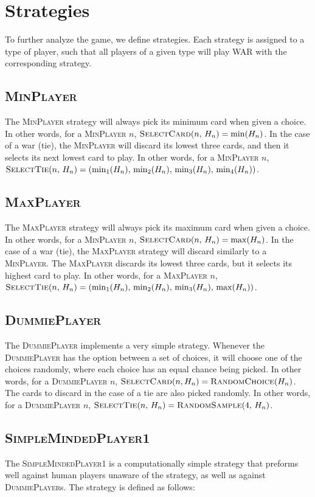 \documentclass[conference]{IEEEtran}
\newcommand\MinP{\textsc{MinPlayer}}
\newcommand\MaxP{\textsc{MaxPlayer}}
\newcommand\DP{\textsc{DummiePlayer}}
\newcommand\SMPo{\textsc{SimpleMindedPlayer1}}
\begin{document}
\section{Strategies}
To further analyze the game, we define strategies. Each strategy is assigned
to a type of player, such that all players of a given type will play WAR with
the corresponding strategy.

\subsection{\MinP}
The \MinP{} strategy will always pick its minimum card when
given a choice. In other words, for a \MinP{} $n$, $\textsc{SelectCard}(n,\,H_n) = \min(H_n)$.
In the case of a war (tie), the \MinP{} will discard
its lowest three cards, and then it selects its next lowest card to play.
In other words, for a \MinP{} $n$, $\textsc{SelectTie}(n,\,H_n) = (\min_1(H_n),\,\min_2(H_n),\,\min_3(H_n),\,\min_4(H_n))$.


\subsection{\MaxP}
The \MaxP{} strategy will always pick its maximum card when
given a choice. In other words, for a \MinP{} $n$, $\textsc{SelectCard}(n,\,H_n) = \max(H_n)$.
In the case of a war (tie), the \MaxP{} strategy will discard
similarly to a \MinP. The \MaxP{} discards its lowest three cards,
but it selects its highest card to play.
In other words, for a \MaxP{} $n$, $\textsc{SelectTie}(n,\,H_n) = (\min_1(H_n),\,\min_2(H_n),\,\min_3(H_n),\,\max(H_n))$.

\subsection{\DP}
The \DP{} implements a very simple strategy. Whenever the \DP{}
has the option between a set of choices, it will choose one of the choices
randomly, where each choice has an equal chance being picked. In other words,
for a \DP{} $n$, $\textsc{SelectCard}(n, H_n) = \textsc{RandomChoice}(H_n)$.
The cards to discard in the case of a tie are also picked randomly.
In other words, for a \DP{} $n$, $\textsc{SelectTie}(n,\,H_n) = \textsc{RandomSample}(4,\,H_n)$.

\subsection{\SMPo}
The \SMPo{} is a computationally simple strategy that preforms well against
human players unaware of the strategy, as well as against \DP{}s. The strategy
is defined as follows:
\end{document}
